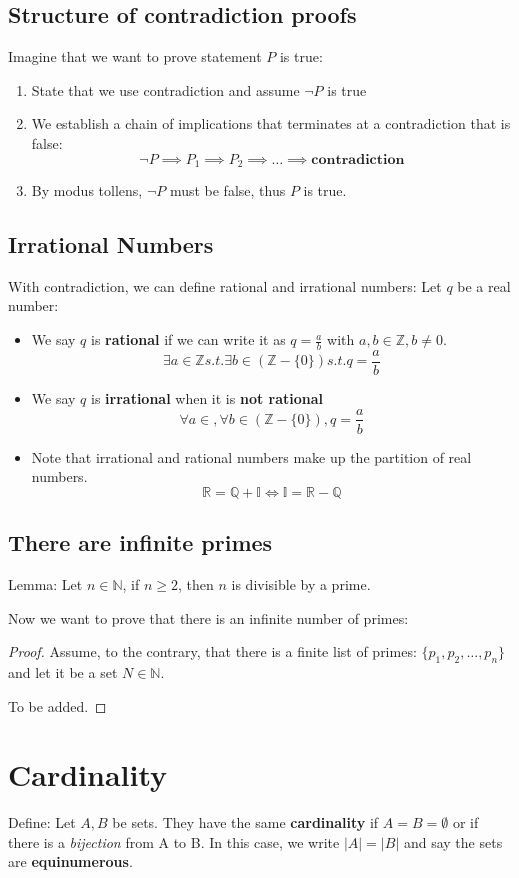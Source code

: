 \documentclass[letterpaper,12pt]{article}
\begin{document}
\subsection{Structure of contradiction proofs}
Imagine that we want to prove statement $P$ is true:
\begin{enumerate}
    \item State that we use contradiction and assume $\neg P$ is true
    \item We establish a chain of implications that terminates at a contradiction that is false: \[\neg P\implies P_1\implies P_2 \implies \ldots \implies \textbf{contradiction}\]
    \item By modus tollens, $\neg P$ must be false, thus $P$ is true.
\end{enumerate}
\subsection{Irrational Numbers}
With contradiction, we can define rational and irrational numbers:
Let $q$ be a real number:
\begin{itemize}
    \item We say $q$ is \textbf{rational} if we can write it as $q=\frac{a}{b}$ with $a,b\in \mathbb{Z},b\neq 0$. \[\exists a\in \mathbb{Z}s.t.\exists b\in (\mathbb{Z}-\{0\})s.t.q=\frac{a}{b}\]
    \item We say $q$ is \textbf{irrational} when it is \textbf{not rational}\[\forall a\in \mathbb,\forall b\in (\mathbb{Z}-\{0\}),q=\frac{a}{b}\]
    \item Note that irrational and rational numbers make up the partition of real numbers. \[\mathbb{R}=\mathbb{Q}+\mathbb{I} \iff \mathbb{I}=\mathbb{R}-\mathbb{Q} \]
\end{itemize}
\subsection{There are infinite primes}
Lemma: Let $n\in\mathbb{N}$, if $n\ge 2$, then $n$ is divisible by a prime.

Now we want to prove that there is an infinite number of primes:
\begin{proof}
    Assume, to the contrary, that there is a finite list of primes: $\{p_1,p_2,\ldots, p_n\}$ and let it be a set $N\in \mathbb{N}$.
    
    To be added.
\end{proof}

\section{Cardinality}
Define: Let $A, B$ be sets. They have the same \textbf{cardinality} if $A=B=\emptyset$ or if there is a \textit{bijection} from A to B. In this case, we write $|A|=|B|$ and say the sets are \textbf{equinumerous}. 
\end{document}
